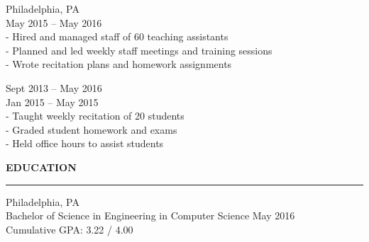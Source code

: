 \documentclass{resume} %
\begin{document}

\hspace*{1mm}{\bf Computer and Information Science Department, University of Pennsylvania } \hfill Philadelphia, PA \\
\hspace*{1mm}{\em Head Teaching Assistant, Introduction to Computer Programming } \hfill May 2015 -- May 2016\\
\hspace*{3mm}- Hired and managed staff of 60 teaching assistants \\
\hspace*{3mm}- Planned and led weekly staff meetings and training sessions \\
\hspace*{3mm}- Wrote recitation plans and homework assignments


\hspace*{1mm}{\em Teaching Assistant, Introduction to Computer Programming } \hfill Sept 2013 -- May 2016\\
\hspace*{1mm}{\em Teaching Assistant, JavaScript } \hfill Jan 2015 -- May 2015 \\
\hspace*{3mm}- Taught weekly recitation of 20 students \\
\hspace*{3mm}- Graded student homework and exams \\
\hspace*{3mm}- Held office hours to assist students


\medskip
\MakeUppercase{\bf Education}
\medskip
\hrule

\hspace*{1mm}{\bf University of Pennsylvania} \hfill Philadelphia, PA \\
\hspace*{1mm}Bachelor of Science in Engineering in Computer Science \hfill May 2016 \\
\hspace*{1mm}Cumulative GPA: 3.22 / 4.00
\end{document}
